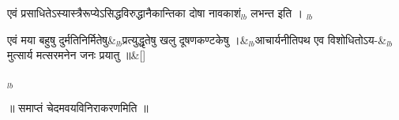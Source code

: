 \documentclass[article,12pt,a4paper]{memoir}%
\newcounter{parCount}
\begin{document}
	  \pstart \leavevmode%
	एवं प्रसाधितेऽस्यास्त्रैरूप्येऽसिद्धविरुद्धानैकान्तिका दोषा नावकाशं{\tiny $_{lb}$} लभन्त इति ।
	{}
	\pend%
      {\tiny $_{lb}$}
	    
	    \stanza[\smallbreak]
	  एवं मया बहुषु दुर्मतिनिर्मितेषु&{\tiny $_{lb}$}प्रत्युद्धृतेषु खलु दूषणकण्टकेषु ।&{\tiny $_{lb}$}आचार्यनीतिपथ एव विशोधितोऽय-&{\tiny $_{lb}$}मुत्सार्य मत्सरमनेन जनः प्रयातु ॥\&[\smallbreak]
	  
	  
	  {\tiny $_{lb}$}
		
		\pstart
		\begin{center}
	      ॥ समाप्तं चेदमवयविनिराकरणमिति ॥
		\end{center}
		\pend
		
	      
	    
	    \endnumbering%
	    \endgroup
	    
     \backmatter 
\end{document}
